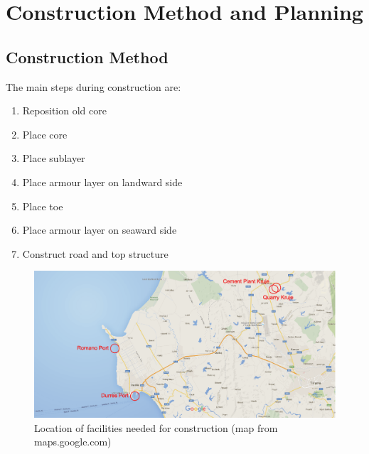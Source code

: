 \chapter{Construction Method and Planning}

\section{Construction Method}

The main steps during construction are:
\begin{enumerate}
 \item Reposition old core
 \item Place core
 \item Place sublayer
 \item Place armour layer on landward side
 \item Place toe
 \item Place armour layer on seaward side
 \item Construct road and top structure
\end{enumerate}

\begin{figure}[!htb]
  \center
  \includegraphics[width=\textwidth]{images/mapConstruction} 
  \caption{Location of facilities needed for construction (map from maps.google.com)}
  \label{fig:mapConstruction}
\end{figure}

